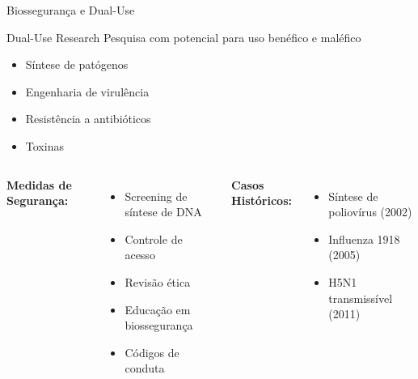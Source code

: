 \begin{frame}{Biossegurança e Dual-Use}
\begin{block}{Dual-Use Research}
Pesquisa com potencial para uso benéfico e maléfico
\begin{itemize}
    \item Síntese de patógenos
    \item Engenharia de virulência
    \item Resistência a antibióticos
    \item Toxinas
\end{itemize}
\end{block}

\vspace{0.3cm}

\begin{columns}
\textbf{Medidas de Segurança:}
\begin{itemize}
    \item Screening de síntese de DNA
    \item Controle de acesso
    \item Revisão ética
    \item Educação em biossegurança
    \item Códigos de conduta
\end{itemize}

\textbf{Casos Históricos:}
\begin{itemize}
    \item Síntese de poliovírus (2002)
    \item Influenza 1918 (2005)
    \item H5N1 transmissível (2011)
\end{itemize}

\vspace{0.3cm}

\end{columns}
\end{frame}

